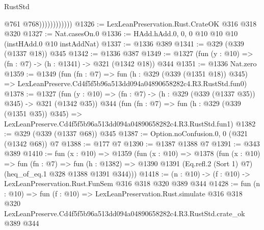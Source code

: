 \begin{lexlean}{RustStd}
\begin{coremodule}
                            @761
                            @768))))))))))))
@1326 := LexLeanPreservation.Rust.CrateOK @316 @318 @320
@1327 := Nat.casesOn.{0}
@1336 := HAdd.hAdd.{0, 0, 0} @10 @10 @10 (instHAdd.{0} @10 instAddNat)
@1337 := @1336 @389
@1341 := @329 (@339 (@1337 @18)) @345
@1342 := @1336 @387
@1349 := @1327 (fun (y : @10) => (fn : @7) -> (h : @1341) -> @321 (@1342 @18)) @344
@1351 := @1336 Nat.zero
@1359 := @1349
    (fun (fn : @7) =>
    fun (h : @329 (@339 (@1351 @18)) @345) =>
    LexLeanPreserve.Cd4f5f5b96a513dd094a04890658282c4.R3.RustStd.fun0)
@1378 := @1327
    (fun (y : @10) => (fn : @7) -> (h : @329 (@339 (@1337 @35)) @345) -> @321 (@1342 @35))
    @344
    (fun (fn : @7) =>
    fun (h : @329 (@339 (@1351 @35)) @345) =>
    LexLeanPreserve.Cd4f5f5b96a513dd094a04890658282c4.R3.RustStd.fun1)
@1382 := @329 (@339 (@1337 @68)) @345
@1387 := Option.noConfusion.{0, 0} (@321 (@1342 @68)) @7
@1388 := @177 @7
@1390 := @1387 @1388 @7
@1391 := @343 @389
@1410 := fun (x : @10) =>
  @1359
    (fun (x : @10) =>
    @1378
      (fun (x : @10) =>
      fun (fn : @7) =>
      fun (h : @1382) =>
      @1390 @1391 (Eq.refl.{2} (Sort 1) @7) (heq_of_eq.{1} @328 @1388 @1391 @344)))
@1418 := (n : @10) -> (f : @10) -> LexLeanPreservation.Rust.FunSem @316 @318 @320 @389 @344
@1428 := fun (n : @10) =>
  fun (f : @10) =>
  LexLeanPreservation.Rust.simulate
    @316
    @318
    @320
    LexLeanPreserve.Cd4f5f5b96a513dd094a04890658282c4.R3.RustStd.crate_ok
    @389
    @344
\end{coremodule}
\end{lexlean}

